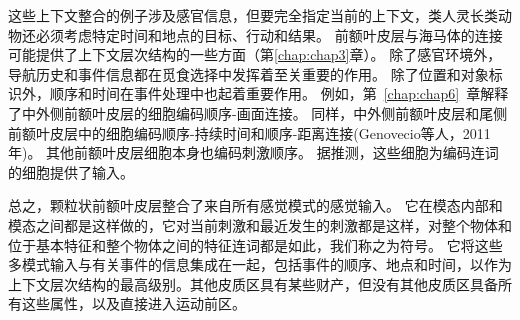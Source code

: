 这些上下文整合的例子涉及感官信息，但要完全指定当前的上下文，类人灵长类动物还必须考虑特定时间和地点的目标、行动和结果。
前额叶皮层与海马体的连接可能提供了上下文层次结构的一些方面（第\ref{chap:chap3}章）。
除了感官环境外，导航历史和事件信息都在觅食选择中发挥着至关重要的作用。
除了位置和对象标识外，顺序和时间在事件处理中也起着重要作用。
例如，第~\ref{chap:chap6}~章解释了中外侧前额叶皮层的细胞编码顺序-画面连接\cite{warden2007representation}。
同样，中外侧前额叶皮层和尾侧前额叶皮层中的细胞编码顺序-持续时间\cite{tsujimoto2009monkey}和顺序-距离连接(Genovecio等人，2011年)。
其他前额叶皮层细胞本身也编码刺激顺序\cite{ninokura2003representation,ninokura2004integration}。
据推测，这些细胞为编码连词的细胞提供了输入。
\par


总之，颗粒状前额叶皮层整合了来自所有感觉模式的感觉输入。
它在模态内部和模态之间都是这样做的，它对当前刺激和最近发生的刺激都是这样，对整个物体和位于基本特征和整个物体之间的特征连词都是如此，我们称之为符号。
它将这些多模式输入与有关事件的信息集成在一起，包括事件的顺序、地点和时间，以作为上下文层次结构的最高级别。其他皮质区具有某些财产，但没有其他皮质区具备所有这些属性，以及直接进入运动前区。




